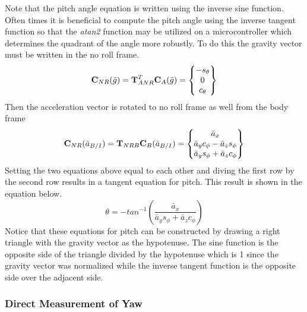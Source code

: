 \documentclass{article}
\begin{document}
Note that the pitch angle equation is written using the inverse sine function. Often times it is beneficial to compute the pitch angle using the inverse tangent function so that the {\it atan2} function may be utilized on a microcontroller which determines the quadrant of the angle more robustly. To do this the gravity vector must be written in the no roll frame. 
\begin{equation}
{\bf C}_{NR}(\bar{g}) = {\bf T}_{ANR}^T{\bf C}_A(\bar{g}) = \begin{Bmatrix} -s_{\theta} \\ 0 \\ c_{\theta}\end{Bmatrix}
\end{equation}
Then the acceleration vector is rotated to no roll frame as well from the body frame
\begin{equation}
{\bf C}_{NR}(\bar{a}_{B/I}) = {\bf T}_{NRB}{\bf C}_B(\bar{a}_{B/I}) = \begin{Bmatrix} \bar{a}_x \\ \bar{a}_y c_{\phi} - \bar{a}_z s_{\phi} \\ \bar{a}_y s_{\phi} + \bar{a}_z c_{\phi} \end{Bmatrix}
\end{equation}
Setting the two equations above equal to each other and diving the first row by the second row results in a tangent equation for pitch. This result is shown in the equation below.
\begin{equation}
\theta = -tan^{-1}\left(\frac{\bar{a}_x}{\bar{a}_y s_{\phi} + \bar{a}_z c_{\phi}}\right)
\end{equation}
Notice that these equations for pitch can be constructed by drawing a right triangle with the gravity vector as the hypotenuse. The sine function is the opposite side of the triangle divided by the hypotenuse which is 1 since the gravity vector was normalized while the inverse tangent function is the opposite side over the adjacent side. 

\subsubsection{Direct Measurement of Yaw}
\end{document}
